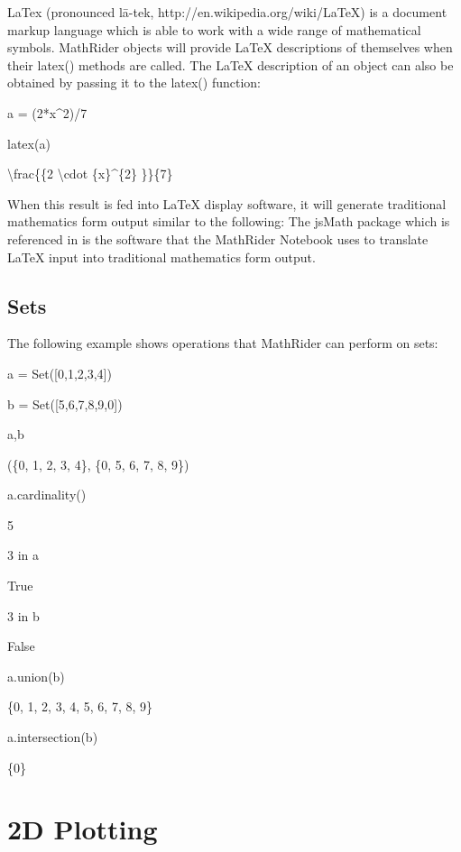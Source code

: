 \documentclass[12pt,oneside]{book}
\begin{document}
LaTex (pronounced l\=a{}-tek, http://en.wikipedia.org/wiki/LaTeX) is a document markup language which is able to work with a wide range of mathematical symbols. MathRider objects will provide LaTeX descriptions of themselves when their latex() methods are called. The LaTeX description of an object can also be obtained by passing it to the latex() function: 

a = (2*x\^{}2)/7

latex(a)

{\textbar}

{\textbackslash}frac\{\{2 {\textbackslash}cdot \{x\}\^{}\{2\} \}\}\{7\}

When this result is fed into LaTeX display software, it will generate traditional mathematics form output similar to the following: 
The jsMath package which is referenced in is the software that the MathRider Notebook uses to translate LaTeX input into traditional mathematics form output. 

\section[Sets]{Sets}

The following example shows operations that MathRider can perform on sets:


a = Set([0,1,2,3,4])

b = Set([5,6,7,8,9,0])

a,b

{\textbar}

(\{0, 1, 2, 3, 4\}, \{0, 5, 6, 7, 8, 9\})


a.cardinality()

{\textbar}

5


3 in a

{\textbar}

True


3 in b

{\textbar}

False


a.union(b)

{\textbar}

\{0, 1, 2, 3, 4, 5, 6, 7, 8, 9\}


a.intersection(b)

{\textbar}

\{0\}

\chapter[2D Plotting]{2D Plotting}
\end{document}
